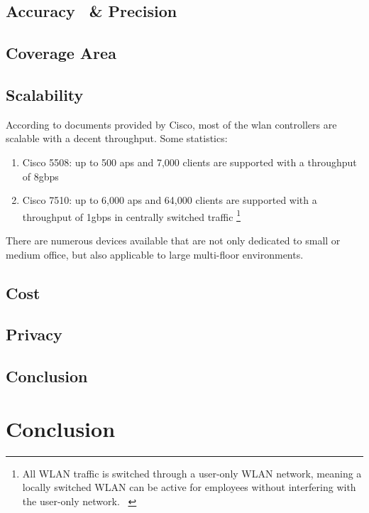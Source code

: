 \subsection{Accuracy ~\& Precision}
\subsection{Coverage Area}
\subsection{Scalability}
According to documents provided by Cisco, most of the \acrshort{wlan} controllers are scalable with a decent throughput. Some statistics:
\begin{enumerate}
\item Cisco 5508: up to 500 \acrshort{ap}s and 7,000 clients are supported with a throughput of 8\acrfull{gbps}
\item Cisco 7510: up to 6,000 \acrshort{ap}s and 64,000 clients are supported with a throughput of 1\acrfull{gbps} in centrally switched traffic \footnote{All WLAN traffic is switched through a user-only WLAN network, meaning a locally switched WLAN can be active for employees without interfering with the user-only network. ~\cite{Woland}}
\end{enumerate}
There are numerous devices available that are not only dedicated to small or medium office, but also applicable to large multi-floor environments.
\subsection{Cost}
\subsection{Privacy}
\subsection{Conclusion}
\section{Conclusion}